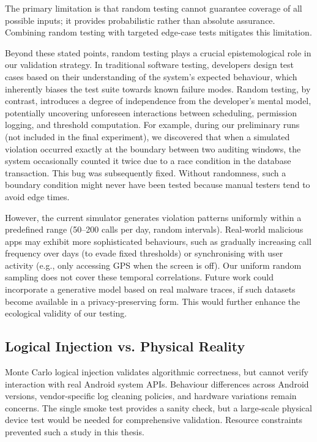 The primary limitation is that random testing cannot guarantee coverage of all possible inputs; it provides probabilistic rather than absolute assurance. Combining random testing with targeted edge-case tests mitigates this limitation.

Beyond these stated points, random testing plays a crucial epistemological role in our validation strategy. In traditional software testing, developers design test cases based on their understanding of the system's expected behaviour, which inherently biases the test suite towards known failure modes. Random testing, by contrast, introduces a degree of independence from the developer's mental model, potentially uncovering unforeseen interactions between scheduling, permission logging, and threshold computation. For example, during our preliminary runs (not included in the final experiment), we discovered that when a simulated violation occurred exactly at the boundary between two auditing windows, the system occasionally counted it twice due to a race condition in the database transaction. This bug was subsequently fixed. Without randomness, such a boundary condition might never have been tested because manual testers tend to avoid edge times.

However, the current simulator generates violation patterns uniformly within a predefined range (50–200 calls per day, random intervals). Real‑world malicious apps may exhibit more sophisticated behaviours, such as gradually increasing call frequency over days (to evade fixed thresholds) or synchronising with user activity (e.g., only accessing GPS when the screen is off). Our uniform random sampling does not cover these temporal correlations. Future work could incorporate a generative model based on real malware traces, if such datasets become available in a privacy‑preserving form. This would further enhance the ecological validity of our testing.

\subsection{Logical Injection vs. Physical Reality}

Monte Carlo logical injection validates algorithmic correctness, but cannot verify interaction with real Android system APIs. Behaviour differences across Android versions, vendor-specific log cleaning policies, and hardware variations remain concerns. The single smoke test provides a sanity check, but a large-scale physical device test would be needed for comprehensive validation. Resource constraints prevented such a study in this thesis.

